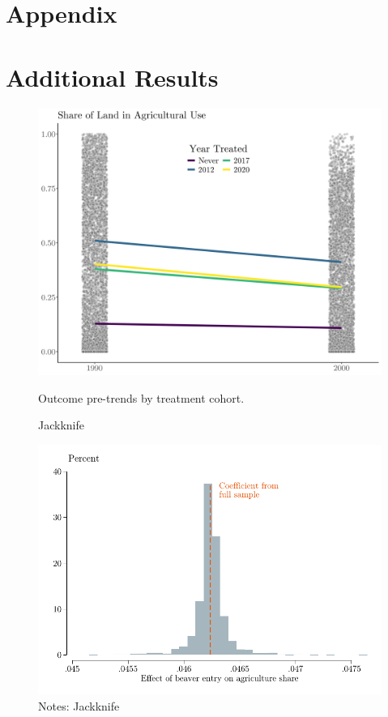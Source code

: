 \documentclass[11pt, english, letterpaper]{article}
\begin{document}
\section*{Appendix}
\section{Additional Results}
\label{sec:addl_results}

%
%


\begin{figure}
    \centering
    \caption{Outcome pre-trends by treatment cohort.}
    \includegraphics[width=0.7\linewidth]{output/figures/outcome_pretrends.png}
    \label{fig:outcome-pretrends}
\end{figure}

\begin{figure}
    \centering
    \caption{Jackknife}
    \includegraphics[width=0.6\linewidth]{output/figures/jackknife_distribution_Soverall_river_cells_AC.pdf}
    \caption*{\justifying \footnotesize Notes: Jackknife}
    \label{fig:est-main-jackknife}
\end{figure}


% 

%  
\end{document}

